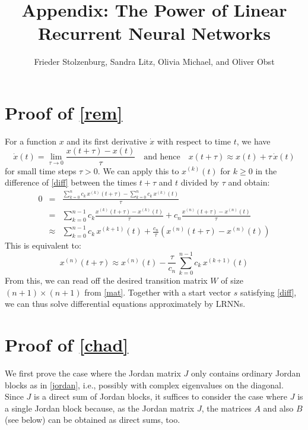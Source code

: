 \documentclass[a4paper,10pt,headings=small]{scrartcl}
\title{Appendix: The Power of Linear Recurrent Neural Networks}
\author{Frieder Stolzenburg, Sandra Litz, Olivia Michael, and Oliver Obst}
\date{}
\theoremstyle{definition}
\begin{document}
\maketitle

\section{Proof of \cref{rem}}\label{proof:rem}

\noindent For a function $x$ and its first derivative $\dot{x}$ with
respect to time $t$, we have
\[
  \dot{x}(t) = \lim\limits_{\tau \to 0} \frac{x(t+\tau)-x(t)}{\tau}
	\quad\text{and hence}\quad
  x(t+\tau) \approx x(t) + \tau\,\dot{x}(t)
\]
for small time steps $\tau>0$. We can apply this to $x^{(k)}(t)$ for $k \ge 0$
in the difference of \cref{diff} between the times $t+\tau$ and $t$ divided by
$\tau$ and obtain:
\begin{eqnarray*}
  0 & = & \frac{\displaystyle\sum_{k=0}^n c_k\,x^{(k)}(t+\tau)-\sum_{k=0}^n c_k\,x^{(k)}(t)}{\tau}\\
    & = & \sum_{k=0}^{n-1} c_k \frac{x^{(k)}(t+\tau)-x^{(k)}(t)}{\tau} + c_n \frac{x^{(n)}(t+\tau)-x^{(n)}(t)}{\tau}\\
    & \approx & \sum_{k=0}^{n-1} c_k\,x^{(k+1)}(t) + \frac{c_n}{\tau} \left(x^{(n)}(t+\tau)-x^{(n)}(t)\right)
\end{eqnarray*}
This is equivalent to:
\[
	x^{(n)}(t+\tau)
	\approx x^{(n)}(t) - \frac{\tau}{c_n}\,\sum_{k=0}^{n-1} c_k\,x^{(k+1)}(t)
\]
From this, we can read off the desired transition matrix $W$ of size $(n+1) \times (n+1)$ from \cref{mat}.
Together with a start vector $s$ satisfying \cref{diff}, we can thus solve
differential equations approximately by LRNNs.

\section{Proof of \cref{chad}}\label{proof:chad}

We first prove the case where the Jordan matrix $J$ only contains ordinary
Jordan blocks as in \cref{jordan}, i.e., possibly with complex eigenvalues
on the diagonal. Since $J$ is a direct sum of Jordan blocks, it suffices to
consider the case where $J$ is a single Jordan block because, as the Jordan
matrix $J$, the matrices $A$ and also $B$ (see below) can be obtained as direct
sums, too.
\end{document}

